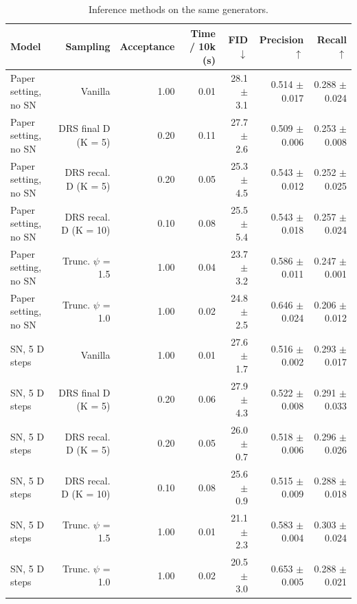 \begin{table}[t]
\centering\small
\begin{tabular}{lrrrrrr}
\toprule
Model & Sampling & Acceptance & Time / 10k (s) & FID $\downarrow$ & Precision $\uparrow$ & Recall $\uparrow$ \\
\midrule
Paper setting, no SN & Vanilla & 1.00 & 0.01 & 28.1 $\pm$ 3.1 & 0.514 $\pm$ 0.017 & 0.288 $\pm$ 0.024 \\
Paper setting, no SN & DRS final D (K = 5) & 0.20 & 0.11 & 27.7 $\pm$ 2.6 & 0.509 $\pm$ 0.006 & 0.253 $\pm$ 0.008 \\
Paper setting, no SN & DRS recal. D (K = 5) & 0.20 & 0.05 & 25.3 $\pm$ 4.5 & 0.543 $\pm$ 0.012 & 0.252 $\pm$ 0.025 \\
Paper setting, no SN & DRS recal. D (K = 10) & 0.10 & 0.08 & 25.5 $\pm$ 5.4 & 0.543 $\pm$ 0.018 & 0.257 $\pm$ 0.024 \\
Paper setting, no SN & Trunc. $\psi$ = 1.5 & 1.00 & 0.04 & 23.7 $\pm$ 3.2 & 0.586 $\pm$ 0.011 & 0.247 $\pm$ 0.001 \\
Paper setting, no SN & Trunc. $\psi$ = 1.0 & 1.00 & 0.02 & 24.8 $\pm$ 2.5 & 0.646 $\pm$ 0.024 & 0.206 $\pm$ 0.012 \\
SN, 5 D steps & Vanilla & 1.00 & 0.01 & 27.6 $\pm$ 1.7 & 0.516 $\pm$ 0.002 & 0.293 $\pm$ 0.017 \\
SN, 5 D steps & DRS final D (K = 5) & 0.20 & 0.06 & 27.9 $\pm$ 4.3 & 0.522 $\pm$ 0.008 & 0.291 $\pm$ 0.033 \\
SN, 5 D steps & DRS recal. D (K = 5) & 0.20 & 0.05 & 26.0 $\pm$ 0.7 & 0.518 $\pm$ 0.006 & 0.296 $\pm$ 0.026 \\
SN, 5 D steps & DRS recal. D (K = 10) & 0.10 & 0.08 & 25.6 $\pm$ 0.9 & 0.515 $\pm$ 0.009 & 0.288 $\pm$ 0.018 \\
SN, 5 D steps & Trunc. $\psi$ = 1.5 & 1.00 & 0.01 & 21.1 $\pm$ 2.3 & 0.583 $\pm$ 0.004 & 0.303 $\pm$ 0.024 \\
SN, 5 D steps & Trunc. $\psi$ = 1.0 & 1.00 & 0.02 & 20.5 $\pm$ 3.0 & 0.653 $\pm$ 0.005 & 0.288 $\pm$ 0.021 \\
\bottomrule
\end{tabular}
\caption{Inference methods on the same generators.}
\end{table}
